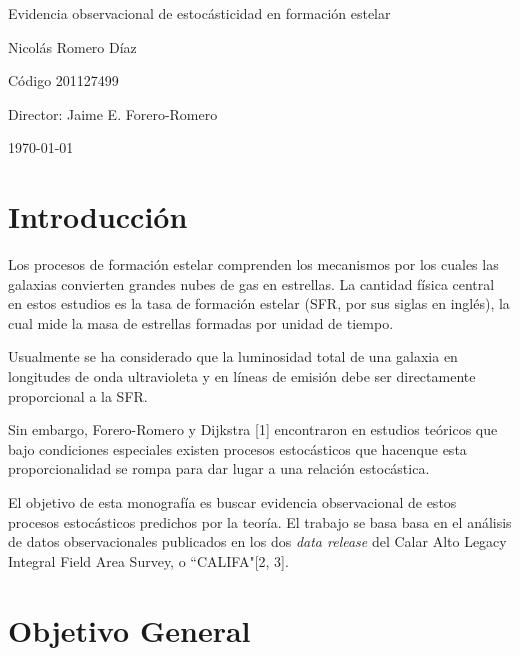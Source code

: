 \documentclass[12pt]{article}
\begin{document}
\begin{center}
\Huge
Evidencia observacional de estoc\'asticidad en formaci\'on estelar

\vspace{3mm}
\Large Nicol\'as Romero D\'iaz

\large
C\'odigo 201127499


\vspace{2mm}
\Large
Director: Jaime E. Forero-Romero

\normalsize
\vspace{2mm}

\today
\end{center}


\normalsize
\section{Introducci\'on}


Los procesos de formaci\'on estelar comprenden los mecanismos por los
cuales las galaxias convierten grandes nubes de gas en estrellas.
La cantidad f\'isica central en estos estudios es la tasa de
formaci\'on estelar (SFR, por sus siglas en ingl\'es), la cual mide
la masa de estrellas formadas por unidad de tiempo.

Usualmente se ha considerado que la luminosidad total de una galaxia
en longitudes de onda ultravioleta y en l\'ineas de emisi\'on debe ser
directamente proporcional a la SFR.

Sin embargo, Forero-Romero y Dijkstra [1] encontraron en estudios
te\'oricos que bajo condiciones especiales existen procesos
estoc\'asticos que hacenque esta proporcionalidad se rompa para dar
lugar a una relaci\'on estoc\'astica.

El objetivo de esta monograf\'ia es buscar evidencia observacional de
estos procesos estoc\'asticos predichos por la teor\'ia.
El trabajo se basa
basa en el an\'alisis de datos observacionales publicados en los dos
\textit{data release} del Calar Alto Legacy Integral Field Area
Survey, o ``CALIFA"[2, 3].


\section{Objetivo General}
\end{document}
